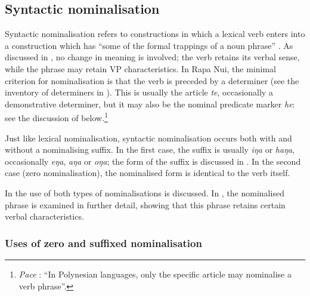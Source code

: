 \subsection{Syntactic nominalisation}\label{sec:3.2.3}
Syntactic nominalisation refers to constructions in which a lexical verb enters into a construction which has “some of the formal trappings of a noun phrase” \citep[65]{Clark1981}. As discussed in , no change in meaning is involved; the verb retains its verbal sense, while the phrase may retain VP characteristics. In Rapa Nui, the minimal criterion for nominalisation is that the verb is preceded by a determiner (see the inventory of determiners in ). This is usually the article \textit{te}, occasionally a demonstrative determiner, but it may also be the nominal predicate marker \textit{he}: see the discussion of  below.\footnote{\label{fn:104}\textit{Pace} \citet[136]{Moyse-Faurie2011}: “In Polynesian languages, only the specific article may nominalise a verb phrase”.}

Just like lexical nominalisation, syntactic nominalisation occurs both with and without a nominalising suffix. In the first case, the suffix is usually \textit{iŋa} or \textit{haŋa}, occasionally \textit{eŋa}, \textit{aŋa} or \textit{oŋa}; the form of the suffix is discussed in . In the second case (zero nominalisation), the nominalised form is identical to the verb itself.

In  the use of both types of nominalisations is discussed. In , the nominalised phrase is examined in further detail, showing that this phrase retains certain verbal characteristics.

\subsubsection[Uses of zero and suffixed nominalisation]{Uses of zero and suffixed nominalisation}\label{sec:3.2.3.1}

